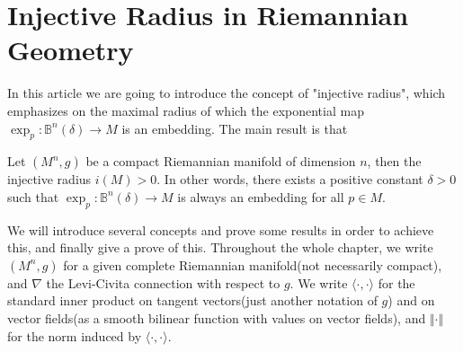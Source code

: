 \chapter{Injective Radius in Riemannian Geometry}
In this article we are going to introduce the concept of "injective radius", which emphasizes on the maximal radius of which the exponential map $\exp_p\colon\mathbb{B}^n (\delta )\to M$ is an embedding. The main result is that
\begin{thr}\label{injective-radius-on-compact-manifolds}
    Let $(M^n ,g)$ be a compact Riemannian manifold of dimension $n$, then the injective radius $i(M)>0$. In other words, there exists a positive constant $\delta >0$ such that $\exp_p\colon\mathbb{B}^n (\delta )\to M$ is always an embedding for all $p\in M$.
\end{thr}
We will introduce several concepts and prove some results in order to achieve this, and finally give a prove of this. Throughout the whole chapter, we write $(M^n ,g)$ for a given complete Riemannian manifold(not necessarily compact), and $\nabla $ the Levi-Civita connection with respect to $g$. We write $\langle\cdot ,\cdot\rangle $ for the standard inner product on tangent vectors(just another notation of $g$) and on vector fields(as a smooth bilinear function with values on vector fields), and $\Vert\cdot\Vert $ for the norm induced by $\langle\cdot ,\cdot\rangle $.
